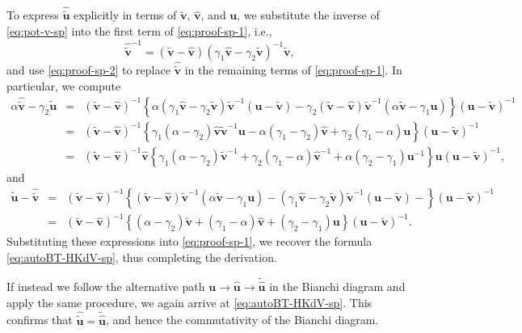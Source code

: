 \documentclass[dvips,10pt]{article}
\newcommand{\bs}{\boldsymbol}
\newcommand{\bsu}{ {\bs{u}}}
\newcommand{\bsv}{ {\bs{v}}}
\theoremstyle{remark} %
\begin{document}
	To express $\hat{\tilde{\bsu}}$ explicitly in terms of $\tilde{\bsv}$, $\hat{\bsv}$, and $\bsu$, we substitute the inverse of  \eqref{eq:pot-v-sp} into the first term of \eqref{eq:proof-sp-1}, i.e.,
	$$ \hat{\tilde{\bsv}}^{-1} =  \left(\tilde{\bsv} -  \hat{\bsv} \right) \left(\gamma_1 \hat{\bsv} -  \gamma_2 \tilde{\bsv} \right)^{-1} \tilde{\bsv},$$
	and use \eqref{eq:proof-sp-2} to replace $\hat{\tilde{\bsv}}$ in the remaining terms of \eqref{eq:proof-sp-1}. In particular, we compute
	\begin{eqnarray*}
		\alpha \hat{\tilde{\bsv}} - \gamma_2 \tilde{\bsu} &=& \left(\tilde{\bsv} -  \hat{\bsv} \right)^{-1} \left\{ \alpha \left(\gamma_1 \hat{\bsv} -  \gamma_2 \tilde{\bsv} \right) \tilde{\bsv}^{-1} \left(\bsu - \tilde{\bsv}\right) - \gamma_2   \left(\tilde{\bsv} -  \hat{\bsv} \right) \tilde{\bsv}^{-1} \left( \alpha \tilde{\bsv} - \gamma_1 \bsu \right)  \right\} \left(\bsu - \tilde{\bsv}\right)^{-1} \\
		&=& \left(\tilde{\bsv} -  \hat{\bsv} \right)^{-1} \left\{ \gamma_1 (\alpha-\gamma_2) \hat{\bsv} \tilde{\bsv}^{-1} \bsu -\alpha (\gamma_1-\gamma_2) \hat{\bsv} + \gamma_2 (\gamma_1-\alpha) \bsu \right\} \left(\bsu - \tilde{\bsv}\right)^{-1} \\
		&=&  \left(\tilde{\bsv} -  \hat{\bsv} \right)^{-1} \hat{\bsv}  \left\{ \gamma_1 (\alpha -\gamma_2) \tilde{\bsv}^{-1}+\gamma_2 (\gamma_1-\alpha) \hat{\bsv}^{-1} + \alpha (\gamma_2-\gamma_1)  \bsu^{-1} \right\} \bsu \left(\bsu - \tilde{\bsv}\right)^{-1} ,
	\end{eqnarray*}
	and
	\begin{eqnarray*}
		\tilde{\bsu}-\hat{\tilde{\bsv}} &=& \left(\tilde{\bsv} -  \hat{\bsv} \right)^{-1} \left\{ \left(\tilde{\bsv} -  \hat{\bsv} \right) \tilde{\bsv}^{-1} \left( \alpha \tilde{\bsv} - \gamma_1 \bsu \right) - \left(\gamma_1 \hat{\bsv} -  \gamma_2 \tilde{\bsv} \right) \tilde{\bsv}^{-1} \left(\bsu - \tilde{\bsv}\right) -   \right\} \left(\bsu - \tilde{\bsv}\right)^{-1} \\
		&=& \left(\tilde{\bsv} -  \hat{\bsv} \right)^{-1} \left\{    (\alpha-\gamma_2) \tilde{\bsv} + (\gamma_1-\alpha) \hat{\bsv} + (\gamma_2-\gamma_1) \bsu \right\} \left(\bsu - \tilde{\bsv}\right)^{-1}.
	\end{eqnarray*}
	Substituting these expressions into \eqref{eq:proof-sp-1}, we recover the formula \eqref{eq:autoBT-HKdV-sp}, thus completing the derivation.
	
	If instead we follow the alternative path $\bsu \rightarrow \hat{\bsu} \rightarrow \tilde{\hat{\bsu}}$ in the Bianchi diagram and apply the same procedure, we again arrive at \eqref{eq:autoBT-HKdV-sp}. This confirms that $\hat{\tilde{\bsu}} = \tilde{\hat{\bsu}}$, and hence the commutativity of the Bianchi diagram.
	
\end{document}
